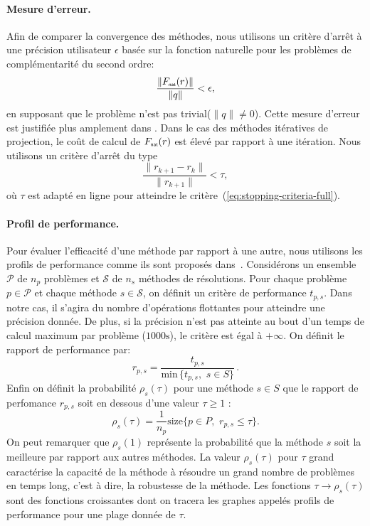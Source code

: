 \documentclass{CSMA2017}
\def\nat{{\hbox{\sf \tiny{nat}}}}
\begin{document}
\paragraph{Mesure d'erreur.} 
Afin de comparer la convergence des méthodes, nous utilisons un critère d'arrêt à une précision utilisateur $\epsilon$ basée sur la fonction naturelle pour les problèmes de complémentarité du second ordre:
\begin{equation}
  \label{eq:stopping-criteria-full}
  \displaystyle\frac{\|F_\nat(r)\|}{\|q\|} < \epsilon,
\end{equation}
en supposant que le problème n'est pas trivial($\|q\| \neq 0$).
%
Cette mesure d'erreur est justifiée plus amplement dans \cite{Facchinei.Pang2003}. Dans le cas des méthodes itératives de projection, le coût de calcul de $F_\nat(r)$ est élevé par rapport à une itération. Nous utilisons un critère d'arrêt du type 
\begin{equation}
  \label{eq:stopping-criteria-light}
  \displaystyle\frac{\|r_{k+1}- r_{k}\|}{\|r_{k+1}\|} < \tau,
\end{equation}
où $\tau$ est adapté en ligne pour atteindre le critère~(\ref{eq:stopping-criteria-full}).

\paragraph{Profil de performance.} 
Pour évaluer l'efficacité d'une méthode par rapport à une autre, nous utilisons les profils de performance comme ils sont proposés dans~\cite{DolanMore_MP2002}. Considérons un ensemble $\mathcal P$ de $n_p$ problèmes et $\mathcal S$  de $n_s$ méthodes de résolutions. Pour chaque problème $p\in \mathcal P$ et chaque méthode $s \in \mathcal S$, on définit un critère de performance $t_{p,s}$. Dans notre cas, il s'agira du nombre d'opérations flottantes pour atteindre une précision donnée. De plus, si la précision n'est pas atteinte au bout d'un temps de calcul maximum par problème ($1000\si{\second}$), le critère est égal à $+\infty$. On définit le rapport de performance par:  
\begin{equation}
 r_{p, s} = \frac{t_{p,s}}{\text{min}\, \{t_{p,s}, \, \, s \in S\}} \, .
\end{equation}
Enfin on définit la probabilité  $\rho_s(\tau)$ pour une méthode $s \in S$ que le rapport de perfomance $r_{p, s}$ soit en dessous d'une valeur $\tau \geq 1$ :
\begin{equation}
 \rho_s(\tau) = \frac{1}{n_p} \text{size} \{p \in P, \, \, r_{p, s} \leq \tau\}. %
\end{equation}
On peut remarquer que $\rho_s(1)$ représente la probabilité que la méthode $s$ soit la meilleure par rapport aux autres méthodes. La valeur $\rho_s(\tau)$ pour $\tau$ grand caractérise la capacité de la méthode à résoudre un grand nombre de problèmes en temps long, c'est  à dire, la robustesse de la méthode. Les fonctions $\tau \rightarrow \rho_s(\tau) $ sont des fonctions croissantes dont  on tracera les graphes appelés profils de performance pour une plage donnée de $\tau$. 
\end{document}
